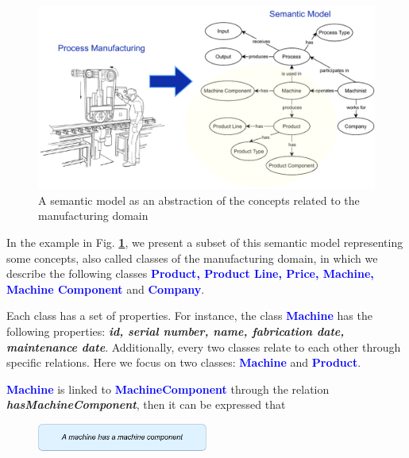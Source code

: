\documentclass{guideline/sty/rapport}
\begin{document}
\begin{figure}[htb!]
    \centering
    \includegraphics[width=1\textwidth,]{images/semanticmodel.pdf}
    \caption{A semantic model as an abstraction of the concepts related to the manufacturing domain}
     \label{fig:semanticmodelexample}
\end{figure}

    
In the example in Fig. \textbf{\ref{fig:semanticmodelexample}}, we present a subset of this semantic model representing some concepts, also called classes of the manufacturing domain, in which we describe the following classes \textcolor{blue}{\textbf{Product, Product Line, Price, Machine, Machine Component}} and \textcolor{blue}{\textbf{Company}}. \singlespacing

Each class has a set of properties. For instance, the class \textcolor{blue}{\textbf{Machine}} has the following properties: \textcolor{arsenic}{\textbf{\textit{id, serial number, name, fabrication date, maintenance date}}}. Additionally, every two classes relate to each other through specific relations. Here we focus on two classes: \textcolor{blue}{\textbf{Machine}} and \textcolor{blue}{\textbf{Product}}. \singlespacing

\newpage

\textcolor{blue}{\textbf{Machine}} is linked to \textcolor{blue}{\textbf{MachineComponent}} through the relation \textcolor{phthalogreen}{\textbf{\textit{hasMachineComponent}}}, then it can be expressed that
    \begin{figure}[H]
        \centering
          \includegraphics[width=0.5\textwidth]{images/implications0.pdf}
    \end{figure}
\end{document}

